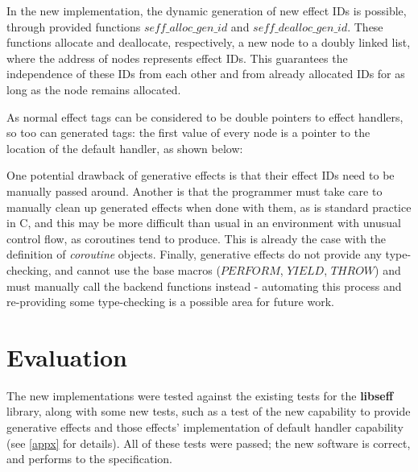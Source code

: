 \documentclass[logo,bsc,singlespacing,parskip,online]{infthesis}
\begin{document}
In the new implementation, the dynamic generation of new effect IDs is possible, through provided functions $seff\_alloc\_gen\_id$ and $seff\_dealloc\_gen\_id$. These functions allocate and deallocate, respectively, a new node to a doubly linked list, where the address of nodes represents effect IDs. This guarantees the independence of these IDs from each other and from already allocated IDs for as long as the node remains allocated.

As normal effect tags can be considered to be double pointers to effect handlers, so too can generated tags: the first value of every node is a pointer to the location of the default handler, as shown below:\todo

One potential drawback of generative effects is that their effect IDs need to be manually passed around. Another is that the programmer must take care to manually clean up generated effects when done with them, as is standard practice in C, and this may be more difficult than usual in an environment with unusual control flow, as coroutines tend to produce. This is already the case with the definition of \textit{coroutine} objects. Finally, generative effects do not provide any type-checking, and cannot use the base macros ($PERFORM$, $YIELD$, $THROW$) and must manually call the backend functions instead - automating this process and re-providing some type-checking is a possible area for future work.





\chapter{Evaluation} \label{eval}

The new implementations were tested against the existing tests for the \textbf{libseff} library, along with some new tests, such as a test of the new capability to provide generative effects and those effects' implementation of default handler capability (see \cref{appx} for details). All of these tests were passed; the new software is correct, and performs to the specification.
\end{document}
